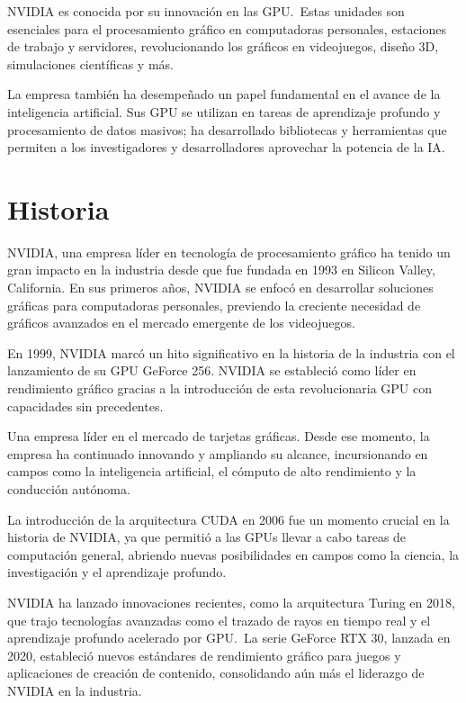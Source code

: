\documentclass[twocolumn, 12pt]{article}
\begin{document}
NVIDIA es conocida por su innovación en las GPU.~Estas unidades
son esenciales para el procesamiento gráfico en computadoras
personales, estaciones de trabajo y servidores, revolucionando
los gráficos en videojuegos, diseño 3D, simulaciones científicas
y más.

La empresa también ha desempeñado un papel fundamental en
el avance de la inteligencia artificial. Sus GPU se utilizan
en tareas de aprendizaje profundo y procesamiento de datos
masivos; ha desarrollado bibliotecas y herramientas que
permiten a los investigadores y desarrolladores aprovechar
la potencia de la IA.\@{}

\section{Historia}

NVIDIA, una empresa líder en tecnología de procesamiento gráfico
ha tenido un gran impacto en la industria desde que fue fundada
en 1993 en Silicon Valley, California. En sus primeros años,
NVIDIA se enfocó en desarrollar soluciones gráficas para
computadoras personales, previendo la creciente necesidad de
gráficos avanzados en el mercado emergente de los videojuegos.

En 1999, NVIDIA marcó un hito significativo en la historia de la
industria con el lanzamiento de su GPU GeForce 256. NVIDIA se
estableció como líder en rendimiento gráfico gracias a la
introducción de esta revolucionaria GPU con capacidades sin
precedentes.

Una empresa líder en el mercado de tarjetas gráficas. Desde ese
momento, la empresa ha continuado innovando y ampliando su alcance,
incursionando en campos como la inteligencia artificial, el cómputo
de alto rendimiento y la conducción autónoma.

La introducción de la arquitectura CUDA en 2006 fue un momento
crucial en la historia de NVIDIA, ya que permitió a las GPUs
llevar a cabo tareas de computación general, abriendo nuevas posibilidades en campos como la ciencia, la investigación y el aprendizaje profundo.

NVIDIA ha lanzado innovaciones recientes, como la arquitectura
Turing en 2018, que trajo tecnologías avanzadas como el trazado
de rayos en tiempo real y el aprendizaje profundo acelerado por
GPU.~La serie GeForce RTX 30, lanzada en 2020,
estableció nuevos estándares de rendimiento gráfico para
juegos y aplicaciones de creación de contenido, consolidando
aún más el liderazgo de NVIDIA en la industria.
\end{document}
